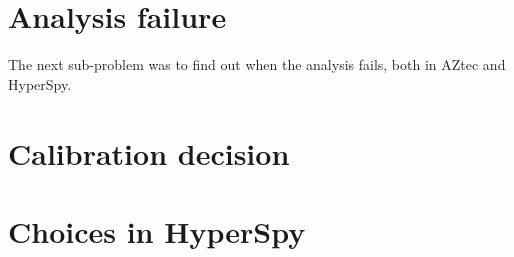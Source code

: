 
%
%
\section{Analysis failure}
\label{sec:discussion:failure}

The next sub-problem was to find out when the analysis fails, both in AZtec and HyperSpy.






\section{Calibration decision}




\section{Choices in HyperSpy}






